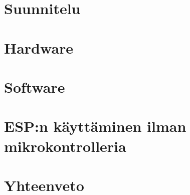 \section{Suunnitelu}

\section{Hardware}

\section{Software}

\section{ESP:n käyttäminen ilman mikrokontrolleria}

\section{Yhteenveto}
